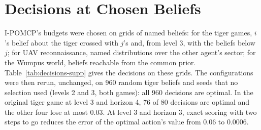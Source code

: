 \documentclass{article}
\begin{document}
\section{Decisions at Chosen Beliefs}

I-POMCP's budgets were chosen on grids of named beliefs: for the tiger games, $i$'s belief about the tiger crossed with $j$'s and, from level 3, with the beliefs below $j$; for UAV reconnaissance, named distributions over the other agent's sector; for the Wumpus world, beliefs reachable from the common prior. Table~\ref{tab:decisions-supp} gives the decisions on these grids. The configurations were then rerun, unchanged, on 960 random tiger beliefs and seeds that no selection used (levels 2 and 3, both games): all 960 decisions are optimal. In the original tiger game at level 3 and horizon 4, 76 of 80 decisions are optimal and the other four lose at most 0.03. At level 3 and horizon 3, exact scoring with two steps to go reduces the error of the optimal action's value from 0.06 to 0.0006.
\end{document}
